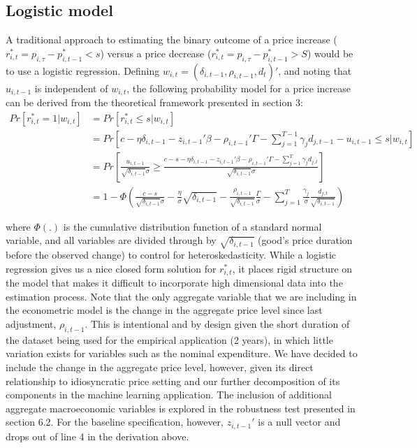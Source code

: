 \documentclass[11pt]{article}
\begin{document}
\subsection{Logistic model}

A traditional approach to estimating the binary outcome of a price increase ($r^{*}_{i,t} = p_{i,\tau} - p^{*}_{i,t-1} < s$) versus a price decrease ($r^{*}_{i,t} = p_{i,\tau} - p^{*}_{i,t-1} > S$) would be to use a logistic regression. Defining $w_{i,t} = (\delta_{i,t-1}, \rho_{i,t-1}, d_t)'$, and noting that $u_{i,t-1}$ is independent of $w_{i,t}$, the following probability model for a price increase can be derived from the theoretical framework presented in section 3:
%
\begin{equation*}
\begin{align}
    Pr[r^{*}_{i,t} = 1 | w_{i,t}] & = Pr[r^{*}_{i,t} \leq s | w_{i,t}] \\
    &= Pr[ c - \eta \delta_{i,t-1} - z_{i,t-1}'\beta - \rho_{i,t-1}'\Gamma - \sum_{j=1}^{T-1} \gamma_{j}d_{j,t-1} - u_{i,t-1} \leq s |w_{i,t} ] \\
    &= Pr\left[\frac{u_{i,t-1}}{\sqrt{\delta_{i,t-1}}\sigma} \geq \frac{c - s - \eta \delta_{i,t-1} - z_{i,t-1}'\beta - \rho_{i,t-1}'\Gamma - \sum_{j=1}^{T} \gamma_{j}d_{j,t}}{\sqrt{\delta_{i,t-1}}\sigma} \right]\\
    &= 1 - \Phi\left(\frac{c-s}{\sqrt{\delta_{i,t-1}}\sigma} - \frac{\eta}{\sigma}\sqrt{\delta_{i,t-1}} -  \frac{\rho_{i,t-1}}{\sqrt{\delta_{i,t-1}}}\frac{\Gamma}{\sigma} - \sum_{j=1}^{T} \frac{\gamma_{j}}{\sigma}\frac{d_{j,t}}{\sqrt{\delta_{i,t-1}}}\right)
\end{align}
\end{equation*}
%

where $\Phi(.)$ is the cumulative distribution function of a standard normal variable, and all variables are divided through by $\sqrt{\delta_{i,t-1}}$ (good's price duration before the observed change) to control for heteroskedasticity. While a logistic regression gives us a nice closed form solution for  $r^{*}_{i,t}$, it places rigid structure on the model that makes it difficult to incorporate high dimensional data into the estimation process. Note that the only aggregate variable that we are including in the econometric model is the change in the aggregate price level since last adjustment, $\rho_{i,t-1}$. This is intentional and by design given the short duration of the dataset being used for the empirical application (2 years), in which little variation exists for variables such as the nominal expenditure. We have decided to include the change in the aggregate price level, however, given its direct relationship to idiosyncratic price setting and our further decomposition of its components in the machine learning application. The inclusion of additional aggregate macroeconomic variables is explored in the robustness test presented in section 6.2. For the baseline specification, however, $z_{i,t-1}'$ is a null vector and drops out of line 4 in the derivation above.  
\end{document}
